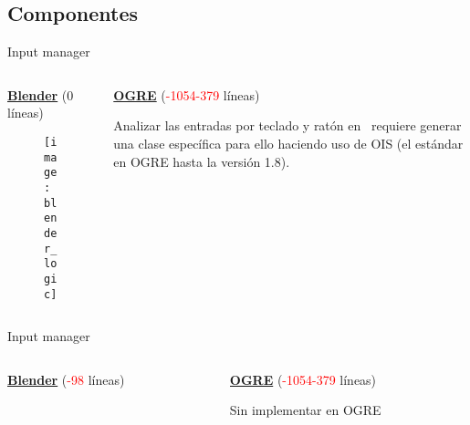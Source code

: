 \subsection{Componentes} 
\begin{frame}{Input manager}
\begin{columns}
  \begin{column}{0.5\textwidth}
    \textbf{\underline{Blender}} (0 líneas)
    
	\begin{figure}
		\texttt{[image: blender\_logic]} 
	\end{figure}
  \end{column}

  \begin{column}{0.5\textwidth}
    \textbf{\underline{OGRE}} (\textcolor{red}{-1054-379} líneas)
    
    \vspace{0.4cm}
    Analizar las entradas por teclado y ratón en \CC $\,$ requiere generar una
    clase específica para ello haciendo uso de OIS (el estándar en OGRE hasta
    la versión 1.8).
    
  \end{column}
\end{columns}
\end{frame}

\begin{frame}{Input manager}
\begin{columns}
  \begin{column}{0.5\textwidth}
    \textbf{\underline{Blender}} (\textcolor{red}{-98} líneas)
    
    \vspace{0.5cm}
  \end{column}

  \begin{column}{0.5\textwidth}
    \textbf{\underline{OGRE}} (\textcolor{red}{-1054-379} líneas)
    
    \vspace{1.5cm}
    Sin implementar en OGRE
  \end{column}
\end{columns}
\end{frame}
